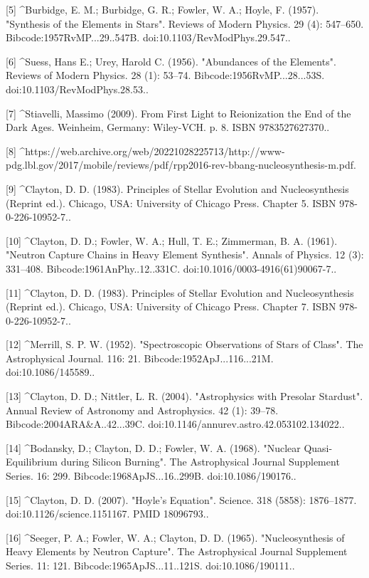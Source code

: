 [5]
^Burbidge, E. M.; Burbidge, G. R.; Fowler, W. A.; Hoyle, F. (1957). "Synthesis of the Elements in Stars". Reviews of Modern Physics. 29 (4): 547–650. Bibcode:1957RvMP...29..547B. doi:10.1103/RevModPhys.29.547..

[6]
^Suess, Hans E.; Urey, Harold C. (1956). "Abundances of the Elements". Reviews of Modern Physics. 28 (1): 53–74. Bibcode:1956RvMP...28...53S. doi:10.1103/RevModPhys.28.53..

[7]
^Stiavelli, Massimo (2009). From First Light to Reionization the End of the Dark Ages. Weinheim, Germany: Wiley-VCH. p. 8. ISBN 9783527627370..

[8]
^https://web.archive.org/web/20221028225713/http://www-pdg.lbl.gov/2017/mobile/reviews/pdf/rpp2016-rev-bbang-nucleosynthesis-m.pdf.

[9]
^Clayton, D. D. (1983). Principles of Stellar Evolution and Nucleosynthesis (Reprint ed.). Chicago, USA: University of Chicago Press. Chapter 5. ISBN 978-0-226-10952-7..

[10]
^Clayton, D. D.; Fowler, W. A.; Hull, T. E.; Zimmerman, B. A. (1961). "Neutron Capture Chains in Heavy Element Synthesis". Annals of Physics. 12 (3): 331–408. Bibcode:1961AnPhy..12..331C. doi:10.1016/0003-4916(61)90067-7..

[11]
^Clayton, D. D. (1983). Principles of Stellar Evolution and Nucleosynthesis (Reprint ed.). Chicago, USA: University of Chicago Press. Chapter 7. ISBN 978-0-226-10952-7..

[12]
^Merrill, S. P. W. (1952). "Spectroscopic Observations of Stars of Class". The Astrophysical Journal. 116: 21. Bibcode:1952ApJ...116...21M. doi:10.1086/145589..

[13]
^Clayton, D. D.; Nittler, L. R. (2004). "Astrophysics with Presolar Stardust". Annual Review of Astronomy and Astrophysics. 42 (1): 39–78. Bibcode:2004ARA&A..42...39C. doi:10.1146/annurev.astro.42.053102.134022..

[14]
^Bodansky, D.; Clayton, D. D.; Fowler, W. A. (1968). "Nuclear Quasi-Equilibrium during Silicon Burning". The Astrophysical Journal Supplement Series. 16: 299. Bibcode:1968ApJS...16..299B. doi:10.1086/190176..

[15]
^Clayton, D. D. (2007). "Hoyle's Equation". Science. 318 (5858): 1876–1877. doi:10.1126/science.1151167. PMID 18096793..

[16]
^Seeger, P. A.; Fowler, W. A.; Clayton, D. D. (1965). "Nucleosynthesis of Heavy Elements by Neutron Capture". The Astrophysical Journal Supplement Series. 11: 121. Bibcode:1965ApJS...11..121S. doi:10.1086/190111..

